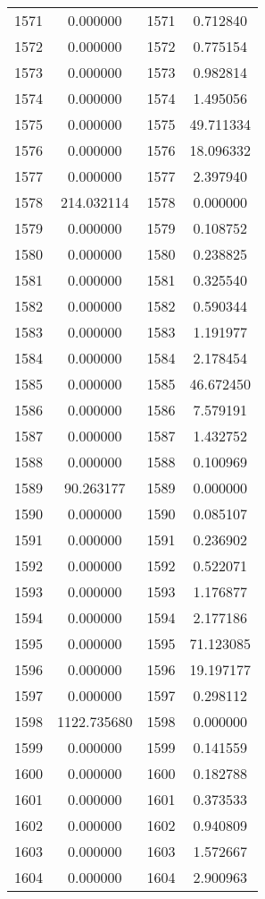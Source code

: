\documentclass[12pt]{article}
\begin{document}
\begin{longtable}{@{}cccc@{}}
1571 & 0.000000 & 1571 & 0.712840 \\
1572 & 0.000000 & 1572 & 0.775154 \\
1573 & 0.000000 & 1573 & 0.982814 \\
1574 & 0.000000 & 1574 & 1.495056 \\
1575 & 0.000000 & 1575 & 49.711334 \\
1576 & 0.000000 & 1576 & 18.096332 \\
1577 & 0.000000 & 1577 & 2.397940 \\
1578 & 214.032114 & 1578 & 0.000000 \\
1579 & 0.000000 & 1579 & 0.108752 \\
1580 & 0.000000 & 1580 & 0.238825 \\
1581 & 0.000000 & 1581 & 0.325540 \\
1582 & 0.000000 & 1582 & 0.590344 \\
1583 & 0.000000 & 1583 & 1.191977 \\
1584 & 0.000000 & 1584 & 2.178454 \\
1585 & 0.000000 & 1585 & 46.672450 \\
1586 & 0.000000 & 1586 & 7.579191 \\
1587 & 0.000000 & 1587 & 1.432752 \\
1588 & 0.000000 & 1588 & 0.100969 \\
1589 & 90.263177 & 1589 & 0.000000 \\
1590 & 0.000000 & 1590 & 0.085107 \\
1591 & 0.000000 & 1591 & 0.236902 \\
1592 & 0.000000 & 1592 & 0.522071 \\
1593 & 0.000000 & 1593 & 1.176877 \\
1594 & 0.000000 & 1594 & 2.177186 \\
1595 & 0.000000 & 1595 & 71.123085 \\
1596 & 0.000000 & 1596 & 19.197177 \\
1597 & 0.000000 & 1597 & 0.298112 \\
1598 & 1122.735680 & 1598 & 0.000000 \\
1599 & 0.000000 & 1599 & 0.141559 \\
1600 & 0.000000 & 1600 & 0.182788 \\
1601 & 0.000000 & 1601 & 0.373533 \\
1602 & 0.000000 & 1602 & 0.940809 \\
1603 & 0.000000 & 1603 & 1.572667 \\
1604 & 0.000000 & 1604 & 2.900963 \\

\end{longtable}
\end{document}
